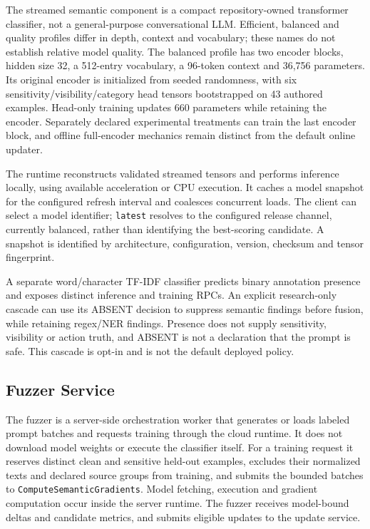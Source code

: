 \documentclass[conference]{IEEEtran}
\begin{document}
The streamed semantic component is a compact repository-owned transformer classifier, not a general-purpose conversational LLM. Efficient, balanced and quality profiles differ in depth, context and vocabulary; these names do not establish relative model quality. The balanced profile has two encoder blocks, hidden size 32, a 512-entry vocabulary, a 96-token context and 36,756 parameters. Its original encoder is initialized from seeded randomness, with six sensitivity/visibility/category head tensors bootstrapped on 43 authored examples. Head-only training updates 660 parameters while retaining the encoder. Separately declared experimental treatments can train the last encoder block, and offline full-encoder mechanics remain distinct from the default online updater.

The runtime reconstructs validated streamed tensors and performs inference locally, using available acceleration or CPU execution. It caches a model snapshot for the configured refresh interval and coalesces concurrent loads. The client can select a model identifier; \texttt{latest} resolves to the configured release channel, currently balanced, rather than identifying the best-scoring candidate. A snapshot is identified by architecture, configuration, version, checksum and tensor fingerprint.

A separate word/character TF-IDF classifier predicts binary annotation presence and exposes distinct inference and training RPCs. An explicit research-only cascade can use its ABSENT decision to suppress semantic findings before fusion, while retaining regex/NER findings. Presence does not supply sensitivity, visibility or action truth, and ABSENT is not a declaration that the prompt is safe. This cascade is opt-in and is not the default deployed policy.

\subsection{Fuzzer Service}

The fuzzer is a server-side orchestration worker that generates or loads labeled prompt batches and requests training through the cloud runtime. It does not download model weights or execute the classifier itself. For a training request it reserves distinct clean and sensitive held-out examples, excludes their normalized texts and declared source groups from training, and submits the bounded batches to \texttt{ComputeSemanticGradients}. Model fetching, execution and gradient computation occur inside the server runtime. The fuzzer receives model-bound deltas and candidate metrics, and submits eligible updates to the update service.
\end{document}
